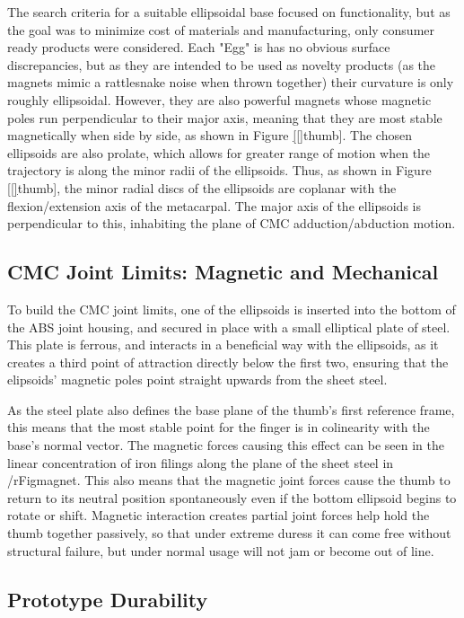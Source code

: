\documentclass[letterpaper, 10 pt, conference]{ieeeconf}  %
\newcommand{\rFig}[1]{Figure \ref{#1}}
\begin{document}
The search criteria for a suitable ellipsoidal base focused on functionality, but as the goal was to minimize cost of materials and manufacturing, only consumer ready products were considered. Each "Egg" is has no obvious surface discrepancies, but as they are intended to be used as novelty products (as the magnets mimic a rattlesnake noise when thrown together) their curvature is only roughly ellipsoidal. However, they are also powerful magnets whose magnetic poles run perpendicular to their major axis, meaning that they are most stable magnetically when side by side, as shown in \rFig[thumb]. The chosen ellipsoids are also prolate, which allows for greater range of motion when the trajectory is along the minor radii of the ellipsoids. Thus, as shown in \rFig[thumb], the minor radial discs of the ellipsoids are coplanar with the flexion/extension axis of the metacarpal. The major axis of the ellipsoids is perpendicular to this, inhabiting the plane of CMC adduction/abduction motion. 

\subsection{CMC Joint Limits: Magnetic and Mechanical}

To build the CMC joint limits, one of the ellipsoids is inserted into the bottom of the ABS joint housing, and secured in place with a small elliptical plate of steel. This plate is ferrous, and interacts in a beneficial way with the ellipsoids, as it creates a third point of attraction directly below the first two, ensuring that the elipsoids' magnetic poles point straight upwards from the sheet steel.

As the steel plate also defines the base plane of the thumb's first reference frame, this means that the most stable point for the finger is in colinearity with the base's normal vector. The magnetic forces causing this effect can be seen in the linear concentration of iron filings along the plane of the sheet steel in /rFig{magnet}. This also means that the magnetic joint forces cause the thumb to return to its neutral position spontaneously even if the bottom ellipsoid begins to rotate or shift. Magnetic interaction creates partial joint forces help hold the thumb together passively, so that under extreme duress it can come free without structural failure, but under normal usage will not jam or become out of line.

\subsection{Prototype Durability}
\end{document}
